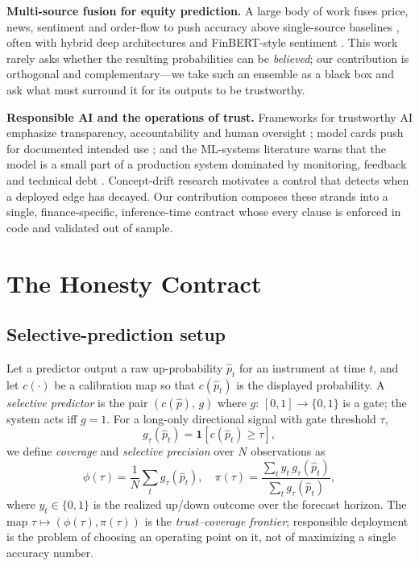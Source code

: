 \documentclass[conference]{IEEEtran}
\begin{document}
\textbf{Multi-source fusion for equity prediction.} A large body of work fuses
price, news, sentiment and order-flow to push accuracy above single-source
baselines \cite{nti2021,long2024,fu2024,moodi2024,farhadi2025,liu2024}, often with
hybrid deep architectures and FinBERT-style sentiment \cite{araci}. This work
rarely asks whether the resulting probabilities can be \emph{believed}; our
contribution is orthogonal and complementary---we take such an ensemble as a black
box and ask what must surround it for its outputs to be trustworthy.

\textbf{Responsible AI and the operations of trust.} Frameworks for trustworthy AI
emphasize transparency, accountability and human oversight
\cite{jobin2019,amodei2016}; model cards push for documented intended use
\cite{mitchell2019}; and the ML-systems literature warns that the model is a small
part of a production system dominated by monitoring, feedback and technical debt
\cite{sculley2015}. Concept-drift research \cite{gama2014} motivates a control that
detects when a deployed edge has decayed. Our contribution composes these strands
into a single, finance-specific, inference-time contract whose every clause is
enforced in code and validated out of sample.

\section{The Honesty Contract}
\label{sec:contract}
\subsection{Selective-prediction setup}
Let a predictor output a raw up-probability $\hat p_t$ for an instrument at time
$t$, and let $c(\cdot)$ be a calibration map so that $c(\hat p_t)$ is the displayed
probability. A \emph{selective predictor} is the pair $(c(\hat p),\,g)$ where
$g:\,[0,1]\to\{0,1\}$ is a gate; the system acts iff $g=1$. For a long-only
directional signal with gate threshold $\tau$,
\begin{equation}
g_\tau(\hat p_t)=\mathbf 1\!\left[c(\hat p_t)\ge\tau\right],
\label{eq:gate}
\end{equation}
we define \emph{coverage} and \emph{selective precision} over $N$ observations as
\begin{equation}
\phi(\tau)=\frac1N\sum_{t} g_\tau(\hat p_t),
\quad
\pi(\tau)=\frac{\sum_{t} y_t\, g_\tau(\hat p_t)}{\sum_{t} g_\tau(\hat p_t)},
\label{eq:cov}
\end{equation}
where $y_t\in\{0,1\}$ is the realized up/down outcome over the forecast horizon.
The map $\tau\mapsto(\phi(\tau),\pi(\tau))$ is the \emph{trust--coverage frontier};
responsible deployment is the problem of choosing an operating point on it, not of
maximizing a single accuracy number.
\end{document}

